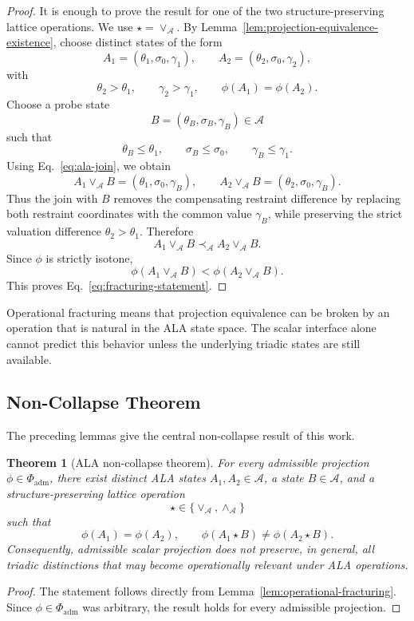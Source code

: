 \documentclass[reqno,final]{amsart}
\theoremstyle{definition}
\theoremstyle{plain}
\newtheorem{theorem}{Theorem}
\theoremstyle{remark}
\providecommand{\cA}{\mathcal{A}}
\providecommand{\cPhi}{\Phi}
\providecommand{\precA}{\prec_{\mathcal A}}
\begin{document}
\begin{proof}
It is enough to prove the result for one of the two structure-preserving lattice operations. We use \(\star=\vee_{\cA}\). By Lemma~\ref{lem:projection-equivalence-existence}, choose distinct states of the form
\[
A_1=(\theta_1,\sigma_0,\gamma_1),
\qquad
A_2=(\theta_2,\sigma_0,\gamma_2),
\]
with
\[
\theta_2>\theta_1,
\qquad
\gamma_2>\gamma_1,
\qquad
\phi(A_1)=\phi(A_2).
\]
Choose a probe state
\[
B=(\theta_B,\sigma_B,\gamma_B)\in\cA
\]
such that
\[
\theta_B\leq\theta_1,
\qquad
\sigma_B\leq\sigma_0,
\qquad
\gamma_B\leq\gamma_1.
\]
Using Eq.~\eqref{eq:ala-join}, we obtain
\[
A_1\vee_{\cA}B=(\theta_1,\sigma_0,\gamma_B),
\qquad
A_2\vee_{\cA}B=(\theta_2,\sigma_0,\gamma_B).
\]
Thus the join with \(B\) removes the compensating restraint difference by replacing both restraint coordinates with the common value \(\gamma_B\), while preserving the strict valuation difference \(\theta_2>\theta_1\). Therefore
\[
A_1\vee_{\cA}B\precA A_2\vee_{\cA}B.
\]
Since \(\phi\) is strictly isotone,
\[
\phi(A_1\vee_{\cA}B)<\phi(A_2\vee_{\cA}B).
\]
This proves Eq.~\eqref{eq:fracturing-statement}.
\end{proof}

Operational fracturing means that projection equivalence can be broken by an operation that is natural in the ALA state space. The scalar interface alone cannot predict this behavior unless the underlying triadic states are still available.

\subsection{Non-Collapse Theorem}
The preceding lemmas give the central non-collapse result of this work.

\begin{theorem}[ALA non-collapse theorem]
\label{thm:ala-non-collapse}
For every admissible projection \(\phi\in\cPhi_{\mathrm{adm}}\), there exist distinct ALA states \(A_1,A_2\in\cA\), a state \(B\in\cA\), and a structure-preserving lattice operation
\[
\star\in\{\vee_{\cA},\wedge_{\cA}\}
\]
such that
\[
\phi(A_1)=\phi(A_2),
\qquad
\phi(A_1\star B)\neq\phi(A_2\star B).
\]
Consequently, admissible scalar projection does not preserve, in general, all triadic distinctions that may become operationally relevant under ALA operations.
\end{theorem}

\begin{proof}
The statement follows directly from Lemma~\ref{lem:operational-fracturing}. Since \(\phi\in\cPhi_{\mathrm{adm}}\) was arbitrary, the result holds for every admissible projection.
\end{proof}
\end{document}
